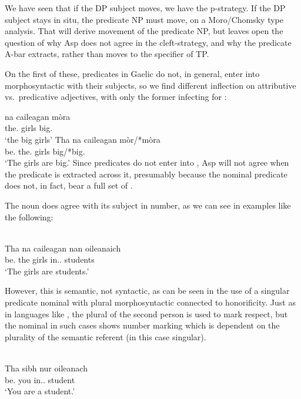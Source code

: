 \documentclass[output=paper]{langsci/langscibook}
\begin{document}
We have seen that if the DP
subject moves, we have the p-strategy. If the DP subject stays in situ, the
predicate NP must move, on a Moro/Chomsky type analysis. That will derive
movement of the predicate NP, but leaves open the question of why Asp does not
agree in the cleft-strategy, and why the predicate A-bar extracts, rather than
moves to the specifier of TP.

On the first of these, predicates in Gaelic do not, in general, enter into
morphosyntactic  with their subjects, so we find different inflection on attributive vs.\ predicative
adjectives, with only the former infecting for :

\ea {}
\ea \gll na caileagan m\`ora\\
the.\Pl{} girls big.\Pl{}\\
\glt \enquote*{the big girls}
\ex \gll Tha na caileagan m\`or/*m\`ora\\
be.\Prs{} the.\Pl{} girls big/*big.\Pl{}\\
\glt \enquote*{The girls are big.}
\z
\z
Since predicates do not enter into , Asp will not agree when the
predicate is extracted across it, presumably because the nominal predicate does
not, in fact, bear a full set of .

The noun does agree with its subject in number, as we can see in examples like
the following:

\ea {}\\
\gll Tha na caileagan nan oileanaich \\
be.\Prs{} the girls in.\Poss.\Tpl{} students\\
\glt \enquote*{The girls are students.}
\z

However, this  is semantic, not syntactic, as can be seen in the use
of a singular predicate nominal with plural morphosyntactic  connected
to honorificity. Just as in languages like , the plural of the second
person is used to mark respect, but the nominal in such cases shows number
marking which is dependent on the plurality of the semantic referent (in this
case singular).

\ea {}\\
\gll Tha sibh nur oileanach \\
be.\Prs{} you in.\Poss.\Spl{} student\\
\glt \enquote*{You are a student.}
\z
\end{document}
